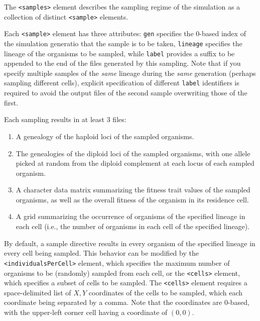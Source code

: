 \documentclass[11pt]{article}
\newcommand{\xmlelem}[1]{{\tt<\textcolor{xmlelem}{#1}>}}
\newcommand{\xmlattr}[1]{{\tt\textcolor{xmlattr}{#1}}}
\begin{document}
The \xmlelem{samples} element describes the sampling regime of the simulation as a collection of distinct \xmlelem{sample} elements.

Each \xmlelem{sample} element has three attributes: \xmlattr{gen} specifies the 0-based index of the simulation generatio that the sample is to be taken, \xmlattr{lineage} specifies the lineage of the organisms to be sampled, while \xmlattr{label} provides a suffix to be appended to the end of the files generated by this sampling.
Note that if you specify multiple samples of the \textit{same} lineage during the \textit{same} generation (perhaps sampling different cells), explicit specification of different \xmlattr{label} identifiers is required to avoid the output files of the second sample overwriting those of the first.

Each sampling results in at least 3 files:
\begin{enumerate}
	\item A genealogy of the haploid loci of the sampled organisms.
	\item The genealogies of the diploid loci of the sampled organisms, with one allele picked at random from the diploid complement at each locus of each sampled organism.
	\item A character data matrix summarizing the fitness trait values of the sampled organisms, as well as the overall fitness of the organism in its residence cell.
	\item A grid summarizing the occurrence of organisms of the specified lineage in each cell (i.e., the number of organisms in each cell of the specified lineage).
\end{enumerate}

By default, a sample directive results in every organism of the specified lineage in every cell being sampled.
This behavior can be modified by the \xmlelem{individualsPerCell} element, which specifies the maximum number of organisms to be (randomly) sampled from each cell, or the \xmlelem{cells} element, which specifies a subset of cells to be sampled.
The \xmlelem{cells} element requires a space-delimited list of $X,Y$ coordinates of the cells to be sampled, which each coordinate being separated by a comma. Note that the coordinates are 0-based, with the upper-left corner cell having a coordinate of $(0,0)$.
\end{document}
